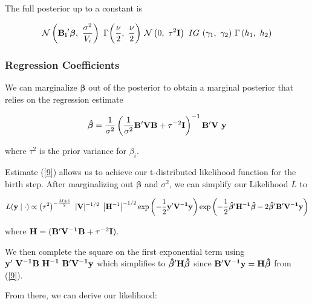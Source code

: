 \documentclass[
]{article}
\begin{document}
The full posterior up to a constant is

\begin{equation}
\label{fullpost}
\mathcal{N}\left({\bf B_{i}}'\boldsymbol{\beta}, ~ \frac{\sigma^2}{V_i}\right)~ \Gamma \bigg(\frac{\nu}{2}, ~\frac{\nu}{2}\bigg)~ \mathcal{N} \left( 0,~\tau^2 {\bf I} \right)~ IG~(\gamma_1,~\gamma_2) ~ \Gamma \left(h_1, ~h_2\right)
\end{equation}

\hypertarget{regression-coefficients}{%
\subsubsection{Regression Coefficients}\label{regression-coefficients}}

We can marginalize \(\boldsymbol\beta\) out of the posterior to obtain a
marginal posterior that relies on the regression estimate

\begin{equation}
\label{9}
\boldsymbol{\hat{\beta}} = 
\frac{1}{\sigma^2}
\left( \frac{1}{\sigma^2} {\bf B'VB} + {\tau^{-2}}{{\bf I}} \right)^{-1} {\bf B'} {\bf V}~{{{\bf y}}}
\end{equation}

where \(\tau^2\) is the prior variance for \(\beta_{i}\).

Estimate (\ref{9}) allows us to achieve our t-distributed likelihood
function for the birth step. After marginalizing out
\(\boldsymbol\beta\) and \(\sigma^2\), we can simplify our Likelihood
\(L\) to

\[
L({\bf y}\mid\cdot) \propto \left(\tau^2\right)^{-\frac{M+1}{2}}~ |{\bf V}|^{-1/2}~ \left|{\bf H}^{-1}\right|^{-1/2}\exp\left(-\frac{1}{2}{\bf y'V^{-1}y} \right) \exp\left(-\frac{1}{2}\boldsymbol{\hat{\beta}}'{\bf H^{-1}}\boldsymbol{\hat{\beta}} - 2\boldsymbol{\hat{\beta}}'{\bf B'V^{-1}y}\right)
\]

where \({\bf H} = ({\bf B'V^{-1}B} + \tau^{-2}{\bf I})\).\newline

We then complete the square on the first exponential term using
\({\bf y'~V^{-1}B~ H^{-1}~B'V^{-1}y}\) which simplifies to
\(\boldsymbol{\hat{\beta}}' {\bf H} \boldsymbol{\hat\beta}\) since
\({\bf B'V^{-1}y} = {\bf H}{\boldsymbol{\hat{\beta}}}\) from
(\ref{9}).\newline

From there, we can derive our likelihood:
\end{document}
